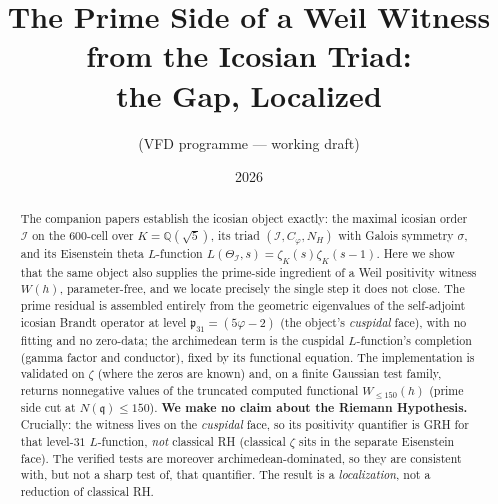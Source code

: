 \documentclass[11pt]{article}
\title{The Prime Side of a Weil Witness from the Icosian Triad:\\ the Gap, Localized}
\author{(VFD programme --- working draft)}
\date{2026}
\theoremstyle{definition}
\newcommand{\Q}{\mathbb{Q}}
\newcommand{\zetaK}{\zeta_{K}}
\newcommand{\Icos}{\mathcal{I}}
\newcommand{\fq}{\mathfrak{q}}
\newcommand{\Wtrunc}{W_{\le 150}}
\begin{document}
\maketitle

\begin{center}
\end{center}
\medskip

\begin{abstract}
The companion papers establish the icosian object exactly: the maximal icosian order
$\Icos$ on the $600$-cell over $K=\Q(\sqrt5)$, its triad $(\Icos, C_\varphi, N_H)$ with
Galois symmetry $\sigma$, and its Eisenstein theta $L$-function
$L(\Theta_\Icos,s)=\zetaK(s)\zetaK(s-1)$. Here we show that the same object also supplies
the prime-side ingredient of a Weil positivity witness $W(h)$, parameter-free, and we
locate precisely the single step it does not close. The prime residual is assembled
entirely from the geometric eigenvalues of the self-adjoint icosian Brandt operator at
level $\mathfrak p_{31}=(5\varphi-2)$ (the object's \emph{cuspidal} face), with no fitting
and no zero-data; the archimedean term is the cuspidal $L$-function's completion (gamma
factor and conductor), fixed by its functional equation. The implementation is validated
on $\zeta$ (where the zeros are known) and, on a finite Gaussian test family, returns
nonnegative values of the truncated computed functional $\Wtrunc(h)$ (prime side cut at
$N(\fq)\le150$). \textbf{We make no claim about the Riemann Hypothesis.}
Crucially: the
witness lives on the \emph{cuspidal} face, so its positivity quantifier is GRH for that
level-$31$ $L$-function, \emph{not} classical RH (classical $\zeta$ sits in the separate
Eisenstein face). The verified tests are moreover archimedean-dominated, so they are
consistent with, but not a sharp test of, that quantifier. The result is a
\emph{localization}, not a reduction of classical RH.
\end{abstract}
\end{document}
